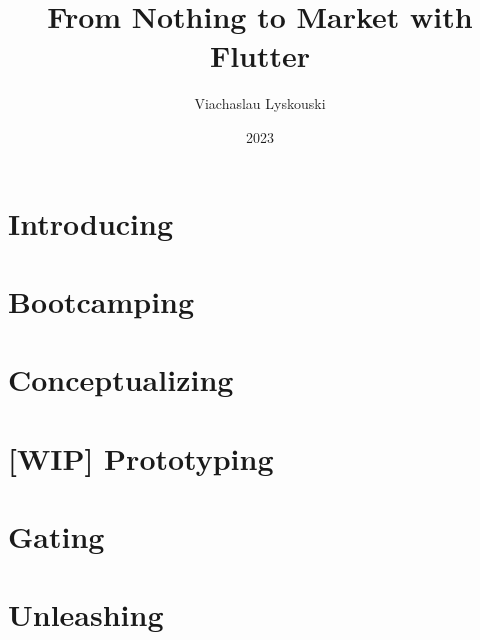 \documentclass[12pt, a4paper, twoside]{extreport}
\author{Viachaslau Lyskouski}
\title{From Nothing to Market with Flutter}
\date{2023}
\begin{document}


\maketitle

%

\tableofcontents



\newpage
\section*{Introducing}


\newpage
\section{Bootcamping}



\newpage
\section{Conceptualizing}


\newpage
\section{[WIP] Prototyping}







\newpage
\section{Gating}







\newpage
\section{Unleashing}






\end{document}
